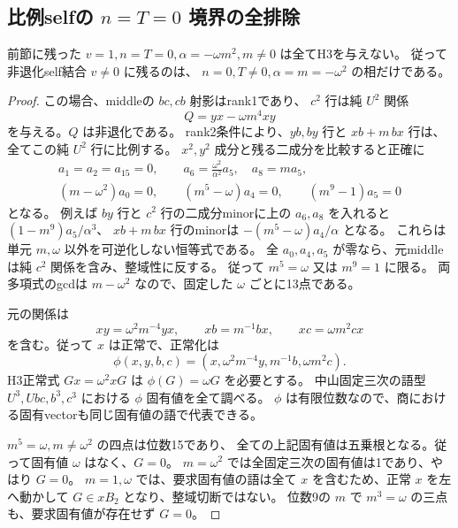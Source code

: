 \subsection{比例selfの $n=T=0$ 境界の全排除}
\label{subsec:cubic-third-root-nonunit-proportional-Tzero}
\begin{theorem}[零corner比例境界も空]
\label{thm:cubic-third-root-nonunit-proportional-Tzero-empty}
前節に残った $v=1,n=T=0,\alpha=-\omega m^2,m\ne0$ は全てH3を与えない。
従って非退化self結合 $v\ne0$ に残るのは、
$n=0,T\ne0,\alpha=m=-\omega^2$ の相だけである。
\end{theorem}
\begin{proof}
この場合、middleの $bc,cb$ 射影はrank1であり、
$c^2$ 行は純 $U^2$ 関係
\[
 Q=yx-\omega m^4xy
\]
を与える。$Q$ は非退化である。
rank2条件により、$yb,by$ 行と $xb+m\,bx$ 行は、全てこの純 $U^2$ 行に比例する。
$x^2,y^2$ 成分と残る二成分を比較すると正確に
\begin{gather*}
 a_1=a_2=a_{15}=0,\qquad
 a_6=\frac{\omega^2}{\alpha^2}a_5,\quad a_8=m a_5,\\
 (m-\omega^2)a_0=0,\qquad
 (m^5-\omega)a_4=0,\qquad
 (m^9-1)a_5=0
\end{gather*}
となる。
例えば $by$ 行と $c^2$ 行の二成分minorに上の $a_6,a_8$ を入れると
$(1-m^9)a_5/\alpha^3$、
$xb+m\,bx$ 行のminorは $-(m^5-\omega)a_4/\alpha$ となる。
これらは単元 $m,\omega$ 以外を可逆化しない恒等式である。
全 $a_0,a_4,a_5$ が零なら、元middleは純 $c^2$ 関係を含み、整域性に反する。
従って $m^5=\omega$ 又は $m^9=1$ に限る。
両多項式のgcdは $m-\omega^2$ なので、固定した $\omega$ ごとに13点である。

元の関係は
\[
 xy=\omega^2m^{-4}yx,\qquad xb=m^{-1}bx,\qquad xc=\omega m^2cx
\]
を含む。従って $x$ は正常で、正常化は
\[
 \phi(x,y,b,c)=(x,\omega^2m^{-4}y,m^{-1}b,\omega m^2c).
\]
H3正常式 $Gx=\omega^2xG$ は $\phi(G)=\omega G$ を必要とする。
中山固定三次の語型 $U^3,Ubc,b^3,c^3$ における $\phi$ 固有値を全て調べる。
$\phi$ は有限位数なので、商における固有vectorも同じ固有値の語で代表できる。

$m^5=\omega,m\ne\omega^2$ の四点は位数15であり、
全ての上記固有値は五乗根となる。従って固有値 $\omega$ はなく、$G=0$。
$m=\omega^2$ では全固定三次の固有値は1であり、やはり $G=0$。
$m=1,\omega$ では、要求固有値の語は全て $x$ を含むため、正常 $x$ を左へ動かして
$G\in xB_2$ となり、整域切断ではない。
位数9の $m$ で $m^3=\omega$ の三点も、要求固有値が存在せず $G=0$。


\end{proof}

